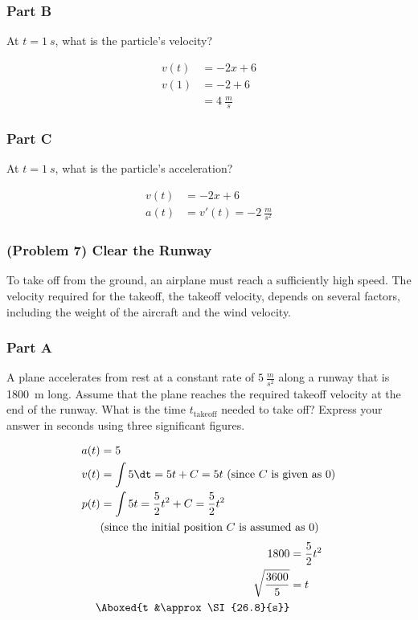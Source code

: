 \subsubsection{Part B}
At $t=\SI{1}{s}$, what is the particle's velocity?

\begin{solution}
	\begin{align*}
		v(t) &= -2x + 6 \\
		v(1) &= -2 + 6 \\
		&= \boxed{\SI{4}{\frac{m}{s}}}
	\end{align*}
\end{solution}

\subsubsection{Part C}
At $t=\SI{1}{s}$, what is the particle's acceleration?

\begin{solution}
	\begin{align*}
		v(t) &= -2x+6 \\
		a(t) &= v'(t) = \boxed{\SI{-2}{\frac{m}{s^2}}}
	\end{align*}
\end{solution}

\newpage

\subsubsection{(Problem 7) Clear the Runway}
To take off from the ground, an airplane must reach a sufficiently high speed. The velocity required for the takeoff, the takeoff velocity, depends on several factors, including the weight of the aircraft and the wind velocity.

\subsubsection{Part A}
A plane accelerates from rest at a constant rate of $\SI{5}{\frac{m}{s^2}}$ along a runway that is \SI{1800}{m} long. Assume that the plane reaches the required takeoff velocity at the end of the runway. What is the time $t_{\mathrm{takeoff}}$ needed to take off? Express your answer in seconds using three significant figures.

\begin{solution}
	\begin{align*}
		a(t) &= 5 \\
		v(t) &= \int 5 \dt = 5t + C = 5t ~ \text{(since $C$ is given as 0)} \\
		p(t) &= \int 5t = \frac{5}{2} t^2 + C = \frac{5}{2}t^2 \\
		& \text{(since the initial position $C$ is assumed as 0)}
	\end{align*}
	\begin{align*}
		1800 &= \frac{5}{2}t^2 \\
		\sqrt{\frac{3600}{5}} &= t \\
		\Aboxed{t &\approx \SI{26.8}{s}}
	\end{align*}
\end{solution}

